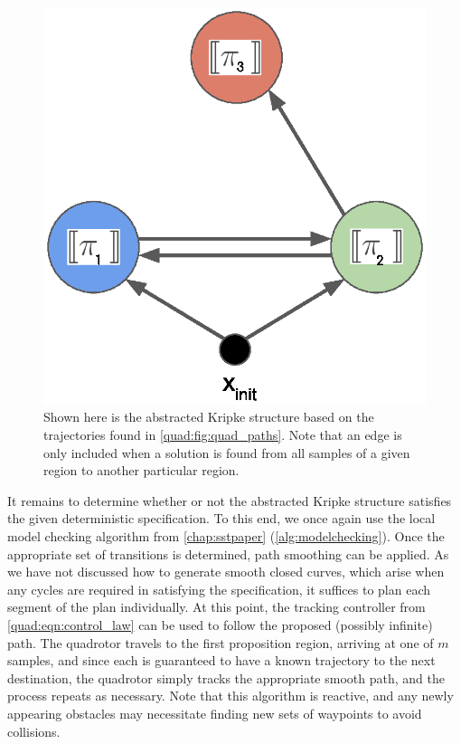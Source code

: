 \begin{figure}[ht]
    \hspace*{-0.6cm}
    \centering
    \includegraphics[scale=0.6]{./figures/quad_abstract_kripke}
    \caption[Abstracted Kripke structure for quadrotor paths]{Shown here is the abstracted Kripke structure based on the trajectories found in \autoref{quad:fig:quad_paths}. Note that an edge is only included when a solution is found from all samples of a given region to another particular region.}
\label{quad:fig:quad_abstract_kripke}
\end{figure}

It remains to determine whether or not the abstracted Kripke structure satisfies the given deterministic \mucalc{} specification. To this end, we once again use the local model checking algorithm from \autoref{chap:sstpaper} (\autoref{alg:modelchecking}). Once the appropriate set of transitions is determined, path smoothing can be applied. As we have not discussed how to generate smooth closed curves, which arise when any cycles are required in satisfying the specification, it suffices to plan each segment of the plan individually. At this point, the tracking controller from \autoref{quad:eqn:control_law} can be used to follow the proposed (possibly infinite) path. The quadrotor travels to the first proposition region, arriving at one of $m$ samples, and since each is guaranteed to have a known trajectory to the next destination, the quadrotor simply tracks the appropriate smooth path, and the process repeats as necessary. Note that this algorithm is reactive, and any newly appearing obstacles may necessitate finding new sets of waypoints to avoid collisions.
